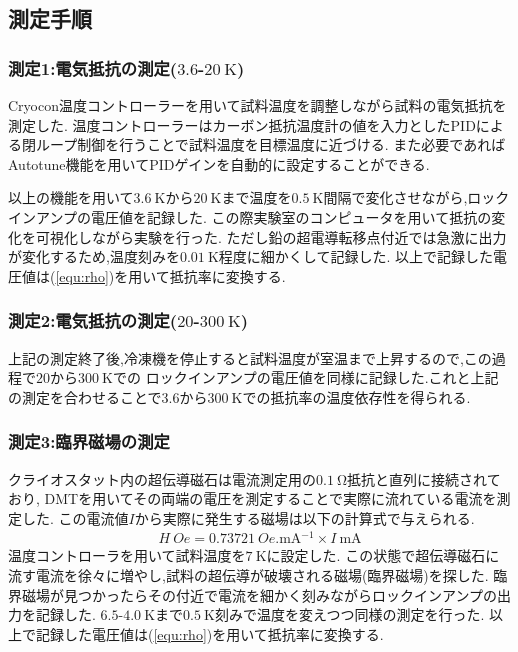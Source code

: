 \subsection{測定手順}
\subsubsection{測定1:電気抵抗の測定($3.6$-$20\ \si{\kelvin}$)}
Cryocon温度コントローラーを用いて試料温度を調整しながら試料の電気抵抗を測定した.
温度コントローラーはカーボン抵抗温度計の値を入力としたPIDによる閉ループ制御を行うことで試料温度を目標温度に近づける.
また必要であればAutotune機能を用いてPIDゲインを自動的に設定することができる.

以上の機能を用いて$3.6\ \si{\kelvin}$から$20\ \si{\kelvin}$まで温度を$0.5\ \si{\kelvin}$間隔で変化させながら,ロックインアンプの電圧値を記録した.
この際実験室のコンピュータを用いて抵抗の変化を可視化しながら実験を行った.
ただし鉛の超電導転移点付近では急激に出力が変化するため,温度刻みを$0.01\ \si{\kelvin}$程度に細かくして記録した.
以上で記録した電圧値は(\ref{equ:rho})を用いて抵抗率に変換する.
\subsubsection{測定2:電気抵抗の測定($20$-$300\ \si{\kelvin}$)}
上記の測定終了後,冷凍機を停止すると試料温度が室温まで上昇するので,この過程で$20$から$300\ \si{\kelvin}$での
ロックインアンプの電圧値を同様に記録した.これと上記の測定を合わせることで$3.6$から$300\ \si{\kelvin}$での抵抗率の温度依存性を得られる.
\subsubsection{測定3:臨界磁場の測定}
クライオスタット内の超伝導磁石は電流測定用の$0.1\ \si{\ohm}$抵抗と直列に接続されており,
DMTを用いてその両端の電圧を測定することで実際に流れている電流を測定した.
この電流値$I$から実際に発生する磁場は以下の計算式で与えられる.
\begin{align}
  H\ \si{Oe}=0.73721\ \si{Oe.\milli\ampere^{-1}}\times I\ \si{\milli\ampere}
\end{align}
温度コントローラを用いて試料温度を$7\ \si{\kelvin}$に設定した.
この状態で超伝導磁石に流す電流を徐々に増やし,試料の超伝導が破壊される磁場(臨界磁場)を探した.
臨界磁場が見つかったらその付近で電流を細かく刻みながらロックインアンプの出力を記録した.
$6.5$-$4.0\ \si{\kelvin}$まで$0.5\ \si{\kelvin}$刻みで温度を変えつつ同様の測定を行った.
以上で記録した電圧値は(\ref{equ:rho})を用いて抵抗率に変換する.